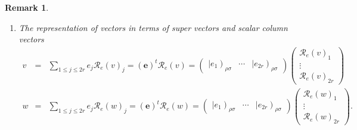 \documentclass[aps,preprint]{revtex4}
\newtheorem{remark}[theorem]{Remark}
\begin{document}
\begin{remark}
\begin{enumerate}
\begin{enumerate}
\begin{eqnarray}
\begin{array}{ccc}
\left\vert e_{1}\right) _{\rho \sigma } & \cdots & \left\vert e_{2r}\right)
_{\rho \sigma }%
\end{array}%
\right) \left( 
\begin{array}{ccc}
\mathcal{R}_{e}\left( T\right) _{11} & \cdots & \mathcal{R}_{e}\left(
T\right) _{12r} \\ 
\vdots & \ddots & \vdots \\ 
\mathcal{R}_{e}\left( T\right) _{2r1} & \cdots & \mathcal{R}_{e}\left(
T\right) _{2r2r}%
\end{array}%
\right) \left( 
\begin{array}{c}
\mathcal{R}_{e}\left( w\right) _{1} \\ 
\vdots \\ 
\mathcal{R}_{e}\left( w\right) _{2r}%
\end{array}%
\right) .
\end{eqnarray}

\item The representation of vectors in terms of super vectors and scalar
column vectors 
\begin{eqnarray}
v &=&\sum_{1\leq j\leq 2r}e_{j}\mathcal{R}_{e}\left( v\right) _{j}=\left( 
\overset{}{\mathbf{e}}\right) ^{t}\mathcal{R}_{e}\left( v\right) =\left( 
\begin{array}{ccc}
\left\vert e_{1}\right) _{\rho \sigma } & \cdots & \left\vert e_{2r}\right)
_{\rho \sigma }%
\end{array}%
\right) \left( 
\begin{array}{c}
\mathcal{R}_{e}\left( v\right) _{1} \\ 
\vdots \\ 
\mathcal{R}_{e}\left( v\right) _{2r}%
\end{array}%
\right) \\
w &=&\sum_{1\leq j\leq 2r}e_{j}\mathcal{R}_{e}\left( w\right) _{j}=\left( 
\overset{}{\mathbf{e}}\right) ^{t}\mathcal{R}_{e}\left( w\right) =\left( 
\begin{array}{ccc}
\left\vert e_{1}\right) _{\rho \sigma } & \cdots & \left\vert e_{2r}\right)
_{\rho \sigma }%
\end{array}%
\right) \left( 
\begin{array}{c}
\mathcal{R}_{e}\left( w\right) _{1} \\ 
\vdots \\ 
\mathcal{R}_{e}\left( w\right) _{2r}%
\end{array}%
\right) .
\end{eqnarray}
\end{enumerate}


\end{enumerate}
\end{remark}
\end{document}
